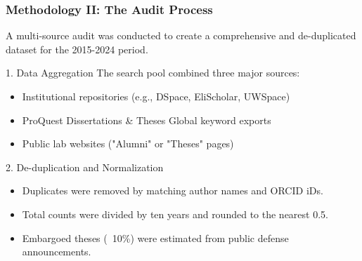 \documentclass[aspectratio=169]{beamer}
\begin{document}
\begin{frame}
    \frametitle{Methodology II: The Audit Process}
    A multi-source audit was conducted to create a comprehensive and de-duplicated dataset for the 2015-2024 period.
    
    \begin{block}{1. Data Aggregation}
        The search pool combined three major sources:
        \begin{itemize}
            \item Institutional repositories (e.g., DSpace, EliScholar, UWSpace)
            \item ProQuest Dissertations \& Theses Global keyword exports
            \item Public lab websites ("Alumni" or "Theses" pages)
        \end{itemize}
    \end{block}
    
    \begin{block}{2. De-duplication and Normalization}
        \begin{itemize}
            \item Duplicates were removed by matching author names and ORCID iDs.
            \item Total counts were divided by ten years and rounded to the nearest 0.5.
            \item Embargoed theses (~10\%) were estimated from public defense announcements.
        \end{itemize}
    \end{block}
\end{frame}
\end{document}
